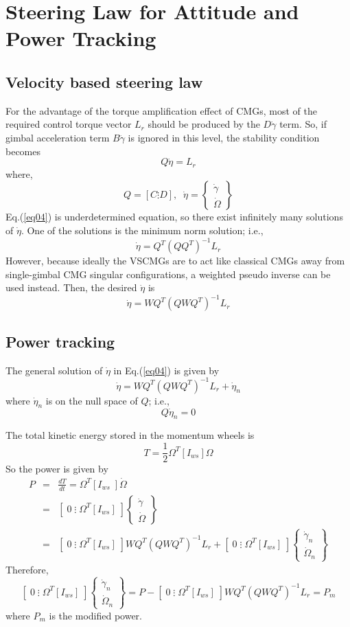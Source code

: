 \documentclass[12pt]{article}
\newcommand{\beq}{\begin{equation}}
\newcommand{\eeq}{\end{equation}}
\newcommand{\beqa}{\begin{eqnarray}}
\newcommand{\eeqa}{\end{eqnarray}}
\begin{document}
\section{Steering Law for Attitude and Power Tracking}
\subsection{Velocity based steering law}
For the advantage of the torque amplification effect of CMGs,
most of the required control torque vector $L_r$ should be
produced by the $D\dot{\gamma}$ term. So, if gimbal acceleration
term $B \ddot{\gamma}$ is ignored in this level, the stability
condition becomes
\beq
Q\dot{\eta} = L_r \label{eq04}
\eeq
where,
\beq
Q = [ C \vdots D ] , \; \; \dot{\eta} = \left\{ \begin{array}{c}
\dot{\gamma} \\ \dot{\Omega} \end{array} \right\}
\eeq
Eq.(\ref{eq04}) is underdetermined equation, so there exist
infinitely many solutions of $\dot{\eta}$.
One of the solutions is the minimum norm solution; i.e.,
\beq
\dot{\eta} = Q^T ( Q Q^T )^{-1} L_r
\eeq
However, because ideally the VSCMGs are to act like classical CMGs
away from single-gimbal CMG singular configurations, a weighted
pseudo inverse can be used instead. Then, the desired $\dot{\eta}$
is \cite{schaub1}
\beq
\dot{\eta} = WQ^T(QWQ^T)^{-1} L_r
\eeq

\subsection{Power tracking}

The general solution of $\dot{\eta}$ in Eq.(\ref{eq04}) is given by
\beq
\dot{\eta} = WQ^T(QWQ^T)^{-1} L_r + \dot{\eta}_n
\eeq
where $\dot{\eta}_n$ is on the null space of $Q$; i.e.,
\beq
Q \dot{\eta}_n = 0
\eeq

The total kinetic energy stored in the momentum wheels is
\beq
T = \frac{1}{2} \Omega^T [I_{ws}] \Omega
\eeq
So the power is given by
\beqa
P &=& \frac{dT}{dt} = \Omega^T [I_{ws} \;] \dot{\Omega} \\
&=& \left[\; 0 \; \vdots \; \Omega^T [I_{ws}] \;\right] \left\{ \begin{array}{c}
\dot{\gamma} \\ \dot{\Omega} \end{array} \right\} \\
&=& \left[\; 0 \; \vdots \; \Omega^T [I_{ws}] \;\right]WQ^T(QWQ^T)^{-1} L_r
+\left[\; 0 \; \vdots \; \Omega^T [I_{ws}] \;\right] \left\{ \begin{array}{c}
\dot{\gamma}_n \\ \dot{\Omega}_n \end{array} \right\}
\eeqa
Therefore,
\beq
\left[\; 0 \; \vdots \; \Omega^T [I_{ws}] \;\right] \left\{ \begin{array}{c}
\dot{\gamma}_n \\ \dot{\Omega}_n \end{array} \right\} = P -\left[\; 0 \; \vdots \; \Omega^T [I_{ws}] \;\right]WQ^T(QWQ^T)^{-1}
L_r = P_m
\eeq
where $P_m$ is the modified power.
\end{document}
